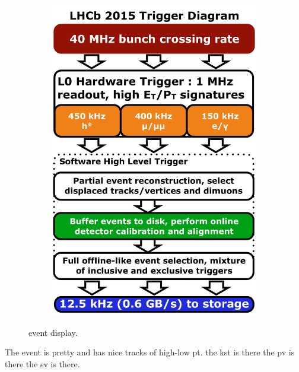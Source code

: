 \begin{figure}[t]
\begin{subfigure}{0.5\textwidth}
    \includegraphics[width=\textwidth]{Figures/Chapter2/LHCb_Trigger_RunII_May2015}
    \caption{}
  \end{subfigure}
  \caption{\BsJpsiKst event display.}
  \label{det_evt_display}
\end{figure}

The event is pretty and has nice tracks of high-low pt. the kst is there the pv is there the sv is there.
